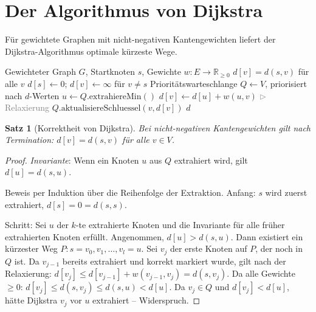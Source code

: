 ﻿\documentclass[a4paper,12pt,openany,oneside]{book}
\renewcommand{\algorithmiccomment}[1]{\hfill\textcolor{gray}{$\triangleright$ #1}}
\theoremstyle{definition}
\theoremstyle{plain}
\newtheorem{satz}{Satz}[chapter]
\theoremstyle{remark}
\begin{document}
\section{Der Algorithmus von Dijkstra}

F\"ur gewichtete Graphen mit nicht-negativen Kantengewichten liefert der
Dijkstra-Algorithmus optimale k\"urzeste Wege.

\begin{algorithm}[H]
  \caption{Algorithmus von Dijkstra}
  \label{alg:dijkstra}
  \begin{algorithmic}[1]
    \Require Gewichteter Graph $G$, Startknoten $s$,
             Gewichte $w: E \to \mathbb{R}_{\geq 0}$
    \Ensure $d[v] = d(s,v)$ f\"ur alle $v$
    \State $d[s] \gets 0$; $d[v] \gets \infty$ f\"ur $v \neq s$
    \State Priorit\"atswarteschlange $Q \gets V$, priorisiert nach $d$-Werten
      \State $u \gets Q.\mathrm{extrahiereMin}()$
          \State $d[v] \gets d[u] + w(u,v)$
          \algorithmiccomment{Relaxierung}
          \State $Q.\mathrm{aktualisiereSchluessel}(v, d[v])$
        \EndIf
      \EndFor
    \EndWhile
    \State \Return $d$
  \end{algorithmic}
\end{algorithm}

\begin{satz}[Korrektheit von Dijkstra]
  Bei nicht-negativen Kantengewichten gilt nach Termination:
  $d[v] = d(s,v)$ f\"ur alle $v \in V$.
\end{satz}

\begin{proof}
  \emph{Invariante}: Wenn ein Knoten $u$ aus $Q$ extrahiert wird,
  gilt $d[u] = d(s,u)$.

  Beweis per Induktion \"uber die Reihenfolge der Extraktion.
  Anfang: $s$ wird zuerst extrahiert, $d[s] = 0 = d(s,s)$.

  Schritt: Sei $u$ der $k$-te extrahierte Knoten und die Invariante
  f\"ur alle fr\"uher extrahierten Knoten erf\"ullt. Angenommen,
  $d[u] > d(s,u)$. Dann existiert ein k\"urzester Weg
  $P: s = v_0, v_1, \ldots, v_l = u$. Sei $v_j$ der erste Knoten auf $P$,
  der noch in $Q$ ist. Da $v_{j-1}$ bereits extrahiert und korrekt
  markiert wurde, gilt nach der Relaxierung:
  $d[v_j] \leq d[v_{j-1}] + w(v_{j-1},v_j) = d(s,v_j)$.
  Da alle Gewichte $\geq 0$:
  $d[v_j] \leq d(s,v_j) \leq d(s,u) < d[u]$.
  Da $v_j \in Q$ und $d[v_j] < d[u]$, h\"atte Dijkstra $v_j$ vor $u$
  extrahiert -- Widerspruch.
\end{proof}
\end{document}
